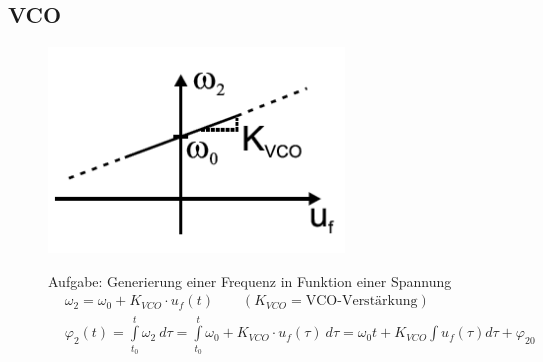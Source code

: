 \subsection{VCO} 
\begin{figure}[h!]
	\begin{minipage}{0.25\textwidth} 
       \includegraphics[width=0.7\textwidth]{images/K_VCO}
	\end{minipage}
	\begin{minipage}{0.75\textwidth}
	Aufgabe: Generierung einer Frequenz in Funktion einer Spannung
	   \begin{equation*}
         \begin{split}
            &\omega_2 = \omega_0+K_{VCO}\cdot u_f(t) \quad \quad (K_{VCO}=\text{VCO-Verstärkung})  \\
            &\varphi_2(t) =\int \limits_{t_0}^{t} \omega_2 \ d\tau =\int \limits_{t_0}^{t} \omega _0 + K_{VCO}\cdot u_f (\tau)\ d \tau =\omega_0 t + K_{VCO} \int \limits_{}^{} u_f(\tau) d\tau +\varphi_{20} \\
         \end{split}
        \end{equation*}
	\end{minipage}
\end{figure}

